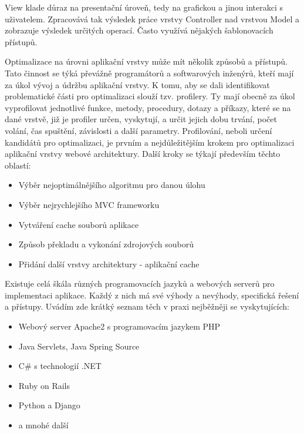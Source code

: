 \documentclass[12pt]{article}
\begin{document}
View klade důraz na presentační úroveň, tedy na grafickou a jinou interakci s uživatelem. Zpracovává tak výsledek práce vrstvy Controller nad vrstvou Model a zobrazuje výsledek určitých operací. Často využívá nějakých šablonovacích přístupů. \cite{design-patterns}

\obrazek
{}

\label{sec:profiler}
Optimalizace na úrovni aplikační vrstvy může mít několik způsobů a přístupů. Tato činnost se týká převážně programátorů a softwarových inženýrů, kteří mají za úkol vývoj a údržbu aplikační vrstvy. K tomu, aby se dali identifikovat problematické části pro optimalizaci slouží tzv. profilery. Ty mají obecně za úkol vyprofilovat jednotlivé funkce, metody, procedury, dotazy a příkazy, které se na dané vrstvě, již je profiler určen, vyskytují, a určit jejich dobu trvání, počet volání, čas spuštění, závislosti a další parametry. Profilování, neboli určení kandidátů pro optimalizaci, je prvním a nejdůležitějším krokem pro optimalizaci aplikační vrstvy webové architektury. Další kroky se týkají především těchto oblastí:

\begin{itemize}
\item Výběr nejoptimálnějšího algoritmu pro danou úlohu
\item Výběr nejrychlejšího MVC frameworku
\item Vytváření cache souborů aplikace
\item Způsob překladu a vykonání zdrojových souborů
\item Přidání další vrstvy architektury - aplikační cache
\end{itemize}

Existuje celá škála různých programovacích jazyků a webových serverů pro implementaci aplikace. Každý z nich má své výhody a nevýhody, specifická řešení a přístupy. Uvádím zde krátký seznam těch v praxi nejběžněji se vyskytujících:

\begin{itemize}
\item Webový server Apache2 s programovacím jazykem PHP
\item Java Servlets, Java Spring Source
\item C\# s technologií .NET
\item Ruby on Rails
\item Python a Django
\item a mnohé další
\end{itemize}
\end{document}

